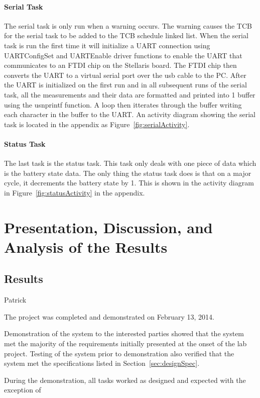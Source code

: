 \documentclass[12pt]{article} %
\begin{document}
	\paragraph{Serial Task}
    The serial task is only run when a warning occurs. The warning causes the TCB for the serial task to be added to the TCB schedule linked list. When the serial task is run the first time it will initialize a UART connection using UARTConfigSet and UARTEnable driver functions to enable the UART that communicates to an FTDI chip on the Stellaris board. The FTDI chip then converts the UART to a virtual serial port over the usb cable to the PC. After the UART is initialized on the first run and in all subsequent runs of the serial task, all the measurements and their data are formatted and printed into 1 buffer using the usnprintf function. A loop then itterates through the buffer writing each character in the buffer to the UART. An activity diagram showing the serial task is located in the appendix as Figure~\ref{fig:serialActivity}.
    
    \paragraph{Status Task}
    The last task is the status task. This task only deals with one piece of data
    which is the battery state data. The only thing the status task does is that on
    a major cycle, it decrements the battery state by 1. This is shown in the
    activity diagram in Figure~\ref{fig:statusActivity} in the appendix.

    \section{Presentation, Discussion, and Analysis of the Results}

    \subsection{Results} Patrick

    The project was completed and demonstrated on February 13, 2014.

    Demonstration of the system to the interested parties showed that the
    system met the majority of the requirements initially presented at the onset of the lab
    project.  Testing of the system prior to demonstration also verified that
    the system met the specifications listed in Section~\ref{sec:designSpec}.

    During the demonstration, all tasks worked as designed and expected with the exception of
\end{document}
